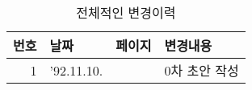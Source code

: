 %
\begin{table}[htbp]
\caption{전체적인 변경이력}\label{table:overview}
  \begin{center}
  \begin{tabular}{|r|l|l|l|} \hline
      번호 & 날짜 & 페이지 & 변경내용 \\ \hline \hline
      1  & '92.11.10. & & 0차 초안 작성 \\ \hline
  \end{tabular}
  \end{center}
\end{table}
%
